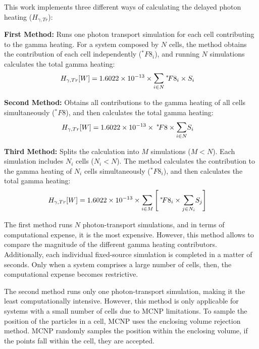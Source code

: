 This work implements three different ways of calculating the delayed photon heating ($H_{\gamma, Tr}$):

\noindent
\textbf{First Method:} Runs one photon transport simulation for each cell contributing to the gamma heating.
For a system composed by $N$ cells, the method obtains the contribution of each cell independently ($^* \! F8_i$), and running $N$ simulations calculates the total gamma heating:
\begin{align}
H_{\gamma, Tr} [W] &= 1.6022 \times 10^{-13} \times \mathlarger{\sum}_{i \in N} \: ^* \! F8_i \times S_i
\end{align}

\noindent
\textbf{Second Method:} Obtains all contributions to the gamma heating of all cells simultaneously ($^* \! F8$), and then calculates the total gamma heating:
\begin{align}
H_{\gamma, Tr} [W] &= 1.6022 \times 10^{-13} \times \: ^* \! F8 \times \mathlarger{\sum}_{i \in N} S_i
\end{align}

\noindent
\textbf{Third Method:} Splits the calculation into $M$ simulations ($M < N$).
Each simulation includes $N_i$ cells ($N_i < N$).
The method calculates the contribution to the gamma heating of $N_i$ cells simultaneously ($^* \! F8_i$), and then calculates the total gamma heating:
\begin{align}
H_{\gamma, Tr} [W] &= 1.6022 \times 10^{-13} \times \mathlarger{\sum}_{i \in M} \left[ \: ^* \! F8_i \times \mathlarger{\sum}_{j \in N_i} S_j \right]
\end{align}


The first method runs $N$ photon-transport simulations, and in terms of computational expense, it is the most expensive.
However, this method allows to compare the magnitude of the different gamma heating contributors.
Additionally, each individual fixed-source simulation is completed in a matter of seconds.
Only when a system comprises a large number of cells, then, the computational expense becomes restrictive.

The second method runs only one photon-transport simulation, making it the least computationally intensive.
However, this method is only applicable for systems with a small number of cells due to MCNP limitations.
To sample the position of the particles in a cell, MCNP uses the enclosing volume rejection method.
MCNP randomly samples the position within the enclosing volume, if the points fall within the cell, they are accepted.

